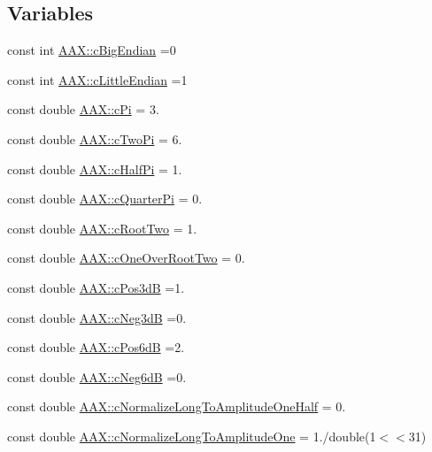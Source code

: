 \subsection*{Variables}
\begin{DoxyCompactItemize}
\item 
const int \mbox{\hyperlink{a00852_af4c24d9d2042fe4252db5431ef126d00}{A\+A\+X\+::c\+Big\+Endian}} =0
\item 
const int \mbox{\hyperlink{a00852_af7fcadf3ad159bf29bbe5a1c494827f2}{A\+A\+X\+::c\+Little\+Endian}} =1
\item 
const double \mbox{\hyperlink{a00852_a8e084631426285b3771b32dd9bb0d1a0}{A\+A\+X\+::c\+Pi}} = 3.
\item 
const double \mbox{\hyperlink{a00852_a13d2c593bc19660c60caf48961f16361}{A\+A\+X\+::c\+Two\+Pi}} = 6.
\item 
const double \mbox{\hyperlink{a00852_a5496b80979f89206ab4966721ef09e07}{A\+A\+X\+::c\+Half\+Pi}} = 1.
\item 
const double \mbox{\hyperlink{a00852_ad4d53f57051266ed14dc1632e95cb04e}{A\+A\+X\+::c\+Quarter\+Pi}} = 0.
\item 
const double \mbox{\hyperlink{a00852_af5ff0caa18f36334fd5c52e97f4a0cad}{A\+A\+X\+::c\+Root\+Two}} = 1.
\item 
const double \mbox{\hyperlink{a00852_a0ae4975165aaf788ed120dbdd82a3cd7}{A\+A\+X\+::c\+One\+Over\+Root\+Two}} = 0.
\item 
const double \mbox{\hyperlink{a00852_ad25c51177cb216caae3b4747b028d8ba}{A\+A\+X\+::c\+Pos3dB}} =1.
\item 
const double \mbox{\hyperlink{a00852_af6f212fd5bb0df08db615fffe4445a3d}{A\+A\+X\+::c\+Neg3dB}} =0.
\item 
const double \mbox{\hyperlink{a00852_aade00875e4e88b00d991197f574c42ed}{A\+A\+X\+::c\+Pos6dB}} =2.
\item 
const double \mbox{\hyperlink{a00852_aca5925abc898233b406504d92ee9ef4c}{A\+A\+X\+::c\+Neg6dB}} =0.
\item 
const double \mbox{\hyperlink{a00852_a93ce2d3935dc06b1c4c887568df84788}{A\+A\+X\+::c\+Normalize\+Long\+To\+Amplitude\+One\+Half}} = 0.
\item 
const double \mbox{\hyperlink{a00852_ad30333177ff94148492a02325045a827}{A\+A\+X\+::c\+Normalize\+Long\+To\+Amplitude\+One}} = 1./double(1$<$$<$31)
$$
\end{DoxyCompactItemize}
